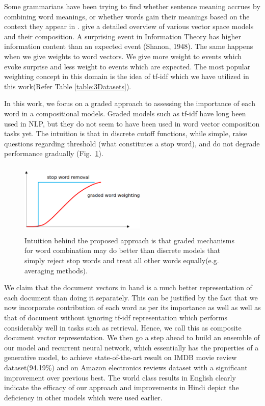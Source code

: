 \documentclass[11pt,a4paper]{article}
\begin{document}
Some grammarians have been trying to find whether sentence meaning accrues by combining word meanings, or whether words gain their meanings based on the context they appear in \cite{Matilal:90}. 
\cite{Turney:10} give a detailed overview of various vector space models and their composition. A surprising event in Information Theory has higher information content than an expected event (Shanon, 1948). The same happens when we give weights to word vectors. We give more weight to events which evoke surprise and less weight to events which are expected. The most popular weighting concept in this domain is the idea of tf-idf which we have utilized in this work(Refer Table \ref{table:3Datasets}).

In this work, we focus on a graded approach to assessing the importance of each word in a compositional models.  Graded models such as tf-idf have long been used in NLP, but they do not seem to have been used in word vector composition tasks yet.  The intuition is that in discrete cutoff functions, while simple, raise questions regarding threshold (what constitutes a stop word), and do not degrade performance gradually (Fig.~\ref{fig:step}).
\begin{figure}[h]
\centering
\includegraphics[width=60mm, height=35mm]{img/step.eps}
\caption{Intuition behind the proposed approach is that graded mechanisms for word combination may do better than discrete models that simply reject stop words and treat all other words equally(e.g. averaging methods).
\label{fig:step}}
\end{figure}

We claim that the document vectors in hand is a much better representation of each document than doing it separately. This can be justified by the fact that we now incorporate contribution of each
word as per its importance as well as well as that of document without ignoring tf-idf representation which performs considerably well in tasks such as retrieval. Hence, we call this as composite document vector representation. We then go a step ahead to build an ensemble of our model and recurrent neural network, which essentially has the properties of a generative model, to achieve state-of-the-art result on IMDB movie review dataset(94.19\%) and on Amazon electronics reviews dataset with a significant improvement over previous best.
The world class results in English clearly indicate the efficacy of our approach and improvements in Hindi depict the deficiency in other models which were used earlier.
\end{document}
